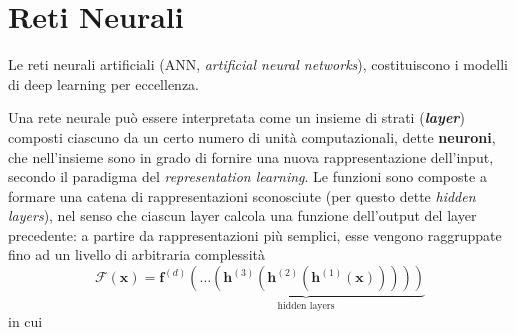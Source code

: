 \section{Reti Neurali}
\label{ANN}

Le reti neurali artificiali (ANN, \textit{artificial neural networks}), costituiscono i modelli di deep learning per eccellenza.

Una rete neurale può essere interpretata come un insieme di strati (\textbf{\textit{layer}}) composti ciascuno da un certo numero di unità computazionali, dette \textbf{neuroni}, che nell'insieme sono in grado di fornire una nuova rappresentazione dell'input, secondo il paradigma del \textit{representation learning}. Le funzioni sono composte a formare una catena di rappresentazioni sconosciute (per questo dette \textit{hidden layers}), nel senso che ciascun layer calcola una funzione dell'output del layer precedente: a partire da rappresentazioni più semplici, esse vengono raggruppate fino ad un livello di arbitraria complessità
\begin{equation*}
\mathcal{F}(\mathbf{x})=\mathbf{f}^{(d)}\underbrace{(\dots(\mathbf{h}^{(3)}(\mathbf{h}^{(2)}(\mathbf{h}^{(1)}(\mathbf{x})))))}_{\text{hidden layers}}
\end{equation*}
in cui
